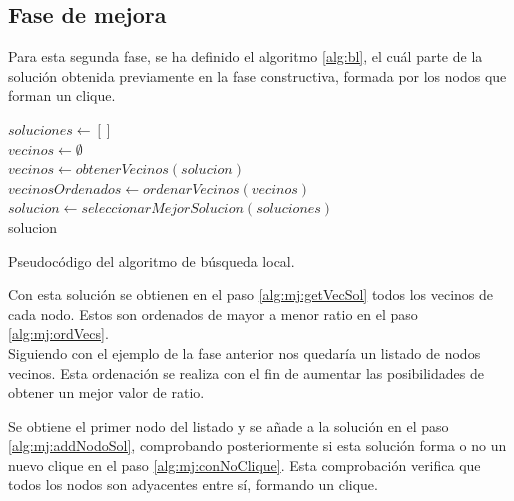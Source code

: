 \subsection{Fase de mejora}
\label{sec:faseBusqueda}
Para esta segunda fase, se ha definido el algoritmo \ref{alg:bl}, el cuál parte de la solución obtenida previamente en la fase constructiva, formada por los nodos que forman un clique.

\begin{algorithm}
	$ soluciones \gets [] $ \\[0.2cm]
	$ vecinos \gets \emptyset $ \\[0.2cm] \label{alg:mj:vecVacios}
	$ vecinos \gets obtenerVecinos(solucion)$ \\[0.2cm] \label{alg:mj:getVecSol}
	$ vecinosOrdenados \gets ordenarVecinos(vecinos)$ \\[0.2cm] \label{alg:mj:ordVecs}
	$ solucion \gets seleccionarMejorSolucion(soluciones) $
	\\[0.2cm] \label{alg:mj:selMejorSol}
	\Return solucion \label{alg:mj:rtSol}
	\caption{Pseudocódigo del algoritmo de búsqueda local.}
	\label{alg:bl}
\end{algorithm}

Con esta solución se obtienen en el paso \ref{alg:mj:getVecSol} todos los vecinos de cada nodo. Estos son ordenados de mayor a menor ratio en el paso \ref{alg:mj:ordVecs}.\\
Siguiendo con el ejemplo de la fase anterior nos quedaría un listado de nodos vecinos. Esta ordenación se realiza con el fin de aumentar las posibilidades de obtener un mejor valor de ratio. 

Se obtiene el primer nodo del listado y se añade a la solución en el paso \ref{alg:mj:addNodoSol}, comprobando posteriormente si esta solución forma o no un nuevo clique en el paso \ref{alg:mj:conNoClique}. Esta comprobación verifica que todos los nodos son adyacentes entre sí, formando un clique.

